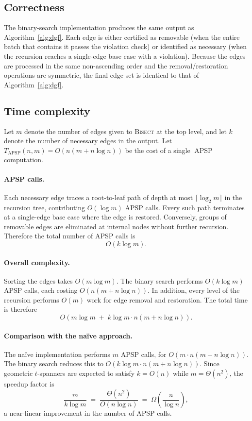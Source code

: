 \documentclass{article}
\DeclareMathOperator{\APSP}{APSP}
\begin{document}
\subsection{Correctness}
The binary-search implementation produces the same output as
Algorithm~\ref{alg:dgf}. Each edge is either certified as removable
(when the entire batch that contains it passes the violation check) or
identified as necessary (when the recursion reaches a single-edge base
case with a violation). Because the edges are processed in the same
non-ascending order and the removal/restoration operations are
symmetric, the final edge set is identical to that of
Algorithm~\ref{alg:dgf}.

\subsection{Time complexity}
Let $m$ denote the number of edges given to \textsc{Bisect} at the top
level, and let $k$ denote the number of necessary edges in the output.
Let $T_{\APSP}(n,m)=O(n(m+n\log n))$ be the cost of a single
$\APSP$ computation.

\paragraph{APSP calls.}
Each necessary edge traces a root-to-leaf path of depth at most
$\lceil\log_2 m\rceil$ in the recursion tree, contributing
$O(\log m)$ APSP calls. Every such path terminates at a single-edge
base case where the edge is restored. Conversely, groups of removable
edges are eliminated at internal nodes without further recursion.
Therefore the total number of APSP calls is
\[
   O(k\log m).
\]

\paragraph{Overall complexity.}
Sorting the edges takes $O(m\log m)$. The binary search performs
$O(k\log m)$ APSP calls, each costing $O(n(m+n\log n))$. In
addition, every level of the recursion performs $O(m)$ work for edge
removal and restoration. The total time is therefore
\[
   O\!\left(m\log m \;+\; k\log m\cdot n(m+n\log n)\right).
\]

\paragraph{Comparison with the na\"ive approach.}
The na\"ive implementation performs $m$ APSP calls, for
$O(m\cdot n(m+n\log n))$. The binary search reduces this to
$O(k\log m\cdot n(m+n\log n))$. Since geometric $t$-spanners are
expected to satisfy $k=O(n)$ while $m=\Theta(n^2)$, the speedup factor
is
\[
   \frac{m}{k\log m} \;=\; \frac{\Theta(n^2)}{O(n\log n)}
   \;=\; \Omega\!\left(\frac{n}{\log n}\right),
\]
a near-linear improvement in the number of APSP calls.
\end{document}
